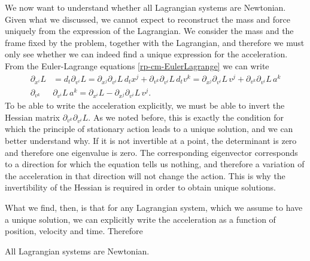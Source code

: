 We now want to understand whether all Lagrangian systems are Newtonian. Given what we discussed, we cannot expect to reconstruct the mass and force uniquely from the expression of the Lagrangian. We consider the mass and the frame fixed by the problem, together with the Lagrangian, and therefore we must only see whether we can indeed find a unique expression for the acceleration. From the Euler-Lagrange equations \ref{rp-cm-EulerLagrange} we can write
\begin{equation}
	\begin{aligned}
	\partial_{x^i}L&=d_t \partial_{v^i} L=\partial_{x^j} \partial_{v^i} L \, d_t x^j + \partial_{v^k} \partial_{v^i} L \, d_t v^k = \partial_{x^j} \partial_{v^i} L \, v^j + \partial_{v^k} \partial_{v^i} L \, a^k \\
	\partial_{v^k} &\partial_{v^i} L \, a^k = \partial_{x^i}L - \partial_{x^j} \partial_{v^i} L \, v^j .
	\end{aligned}
\end{equation}
To be able to write the acceleration explicitly, we must be able to invert the Hessian matrix $\partial_{v^k} \partial_{v^i} L$. As we noted before, this is exactly the condition for which the principle of stationary action leads to a unique solution, and we can better understand why. If it is not invertible at a point, the determinant is zero and therefore one eigenvalue is zero. The corresponding eigenvector corresponds to a direction for which the equation tells us nothing, and therefore a variation of the acceleration in that direction will not change the action. This is why the invertibility of the Hessian is required in order to obtain unique solutions.

What we find, then, is that for any Lagrangian system, which we assume to have a unique solution, we can explicitly write the acceleration as a function of position, velocity and time. Therefore
\begin{insight}
	All Lagrangian systems are Newtonian.
\end{insight}

